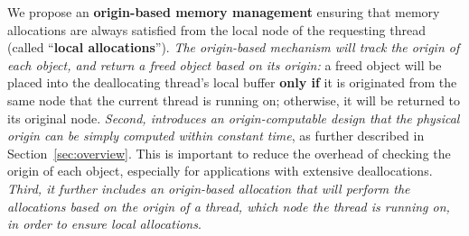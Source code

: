 
We propose an \textbf{origin-based memory management} ensuring that memory allocations are always satisfied from the local node of the requesting thread (called ``\textbf{local allocations}''). 
 \textit{The origin-based mechanism will track the origin of each object, and return a freed object based on its origin:} a freed object will be placed into the deallocating thread's local buffer \textbf{only if} it is originated from the same node that the current thread is running on; otherwise, it will be returned to its original node. \textit{Second, \NM{} introduces an origin-computable design that the physical origin can be simply computed within constant time}, as further described in Section~\ref{sec:overview}. This is important to reduce the overhead of checking the origin of each object, especially for applications with extensive deallocations. 
\textit{Third, it further includes an origin-based allocation that will perform the allocations based on the origin of a thread, which node the thread is running on, in order to ensure local allocations}.  



